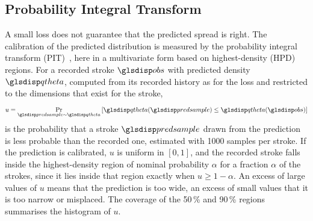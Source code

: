 \documentclass[12pt]{report}
\begin{document}
\subsection{Probability Integral Transform}
\label{sec:pit}
A small loss does not guarantee that the predicted spread is right. The calibration of the predicted distribution is measured by the probability integral transform (PIT)~\cite{gneiting2007probabilistic}, here in a multivariate form based on highest-density (HPD) regions. For a recorded stroke $\sym{obs}$ with predicted density $\sym{qtheta}$, computed from its recorded history as for the loss and restricted to the dimensions that exist for the stroke,
\begin{equation}
    u=\Pr_{\sym{predsample}\sim \sym{qtheta}}\left[\sym{qtheta}(\sym{predsample})\le \sym{qtheta}(\sym{obs})\right]
\end{equation}
is the probability that a stroke $\sym{predsample}$ drawn from the prediction is less probable than the recorded one, estimated with 1000 samples per stroke. If the prediction is calibrated, $u$ is uniform in $[0,1]$, and the recorded stroke falls inside the highest-density region of nominal probability $\alpha$ for a fraction $\alpha$ of the strokes, since it lies inside that region exactly when $u\ge1-\alpha$. An excess of large values of $u$ means that the prediction is too wide, an excess of small values that it is too narrow or misplaced. The coverage of the 50\,\% and 90\,\% regions summarises the histogram of $u$.
\end{document}
